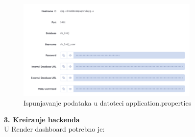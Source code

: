                 \begin{figure}[H]
				\includegraphics[width=0.8\textwidth,height=0.25\textheight]{slike/postgresqlNewFilled.png}
				\centering
				\caption{Ispunjavanje podataka u datoteci application.properties}
				\label{fig:applicationPropertiesDB}
			\end{figure}

                \textbf{3. Kreiranje backenda}\\

                U Render dashboard potrebno je:

